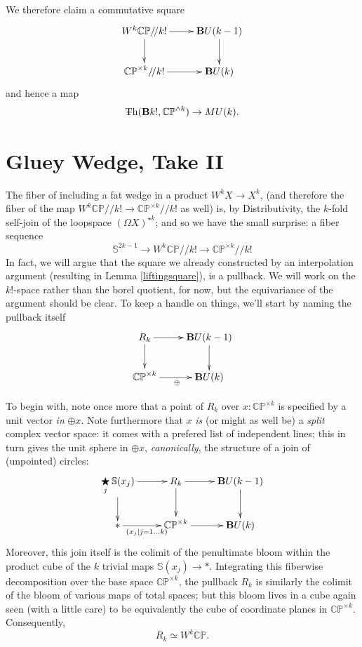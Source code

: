 \documentclass{article}
\newcommand{\CP}{\mathbb{CP}}
\newcommand{\sph}{\mathbb{S}}
\newcommand{\6}{\partial}
\newcommand{\8}{\infty}
\newcommand{\bq}{/\!/}
\newcommand{\smsh}{\wedge}
\begin{document}
\begin{lemma}\label{liftingsquare} We therefore claim a commutative square
$$ \xymatrix{W^k\CP \bq k! \ar[r]\ar[d] & \deloop U(k-1)\ar[d] \\
\CP^{\times k} \bq k! \ar[r] & \deloop U(k)} $$ and hence a map 
$$ \Th(\deloop k!,\CP^{\smsh k}) \to MU(k) .$$
\end{lemma}

\section{Gluey Wedge, Take II}

The fiber of including a fat wedge in a product $W^k X \to X^k$, (and therefore the fiber of the map $W^k \CP \bq k! \to \CP^{\times k} \bq k!$ as well) is, by Distributivity, the $k$-fold self-join of the loopspace $(\Omega X)^{\star k}$; and so we have the small surprise: a fiber sequence
$$ \sph^{2k-1} \to W^k\CP \bq k! \to \CP^{\times k} \bq k! $$ 
In fact, we will argue that the square we already constructed by an interpolation argument (resulting in Lemma \ref{liftingsquare}), is a pullback.  We will work on the $k!$-space rather than the borel quotient, for now, but the equivariance of the argument should be clear.  To keep a handle on things, we'll start by naming the pullback itself
$$ \begin{xy}\xymatrix{
R_k \ar[r] \ar[d] & \deloop U(k-1) \ar[d] \\
\CP^{\times k} \ar[r]_\oplus & \deloop U(k)
}\end{xy} $$

To begin with, note once more that a point of $R_k$ over $x : \CP^{\times k} $ is specified by a unit vector {\em in} $\oplus x$.  Note furthermore that $x$ {\em is} (or might as well be) a {\em split} complex vector space: it comes with a prefered list of independent lines; this in turn gives the unit sphere in $\oplus x$, {\em canonically}, the structure of a join of (unpointed) circles:
$$ \begin{xy}\xymatrix{
{\underset{j}{\bigstar}\,\sph(x_j)} \ar[r] \ar[d] & R_k \ar[r] \ar[d] & \deloop U(k-1) \ar[d] \\
{*} \ar[r]_{(x_j|j=1\dots k)} & \CP^{\times k} \ar[r] & \deloop U(k) 
}\end{xy}$$
Moreover, this join itself is the colimit of the penultimate bloom within the product cube of the $k$ trivial maps $\sph(x_j) \to *$.  
Integrating this fiberwise decomposition over the base space $\CP^{\times k}$,
 the pullback $R_k$ is similarly the colimit of the bloom of various maps of total spaces;
 but this bloom lives in a cube again seen (with a little care) to be equivalently the cube of coordinate planes in $\CP^{\times k}$.  Consequently,
$$ R_k \simeq W^k \CP .$$
\end{document}
